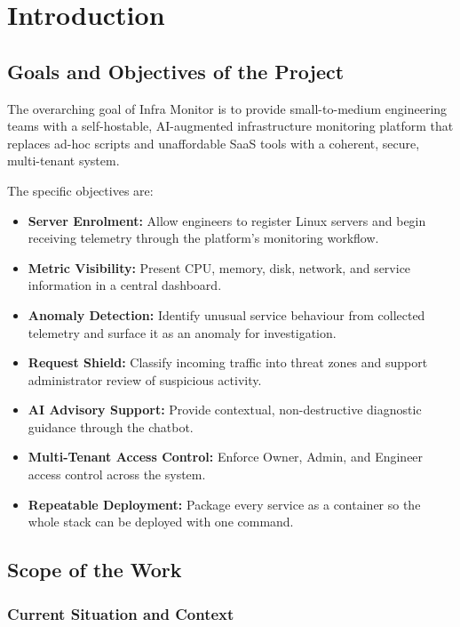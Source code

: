 \chapter{Introduction}\label{ch:intro}

\section{Goals and Objectives of the Project}

The overarching goal of Infra Monitor is to provide small-to-medium engineering
teams with a self-hostable, AI-augmented infrastructure monitoring
platform that replaces ad-hoc scripts and unaffordable SaaS tools with a
coherent, secure, multi-tenant system.

The specific objectives are:

\begin{itemize}[leftmargin=2em]
  \item \textbf{Server Enrolment:} Allow engineers to register Linux servers and
        begin receiving telemetry through the platform's monitoring workflow.
  \item \textbf{Metric Visibility:} Present CPU, memory, disk, network, and
        service information in a central dashboard.
  \item \textbf{Anomaly Detection:} Identify unusual service behaviour from
        collected telemetry and surface it as an anomaly for investigation.
  \item \textbf{Request Shield:} Classify incoming traffic into threat zones and
        support administrator review of suspicious activity.
  \item \textbf{AI Advisory Support:} Provide contextual, non-destructive
        diagnostic guidance through the chatbot.
  \item \textbf{Multi-Tenant Access Control:} Enforce Owner, Admin, and Engineer
        access control across the system.
  \item \textbf{Repeatable Deployment:} Package every service as a
        container so the whole stack can be deployed with one command.
\end{itemize}

\section{Scope of the Work}

\subsection{Current Situation and Context}

